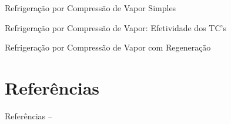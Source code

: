     \begin{frame}{Refrigeração por Compressão de Vapor Simples}\vspace*{-0em}
    \end{frame}

    \begin{frame}{Refrigeração por Compressão de Vapor: Efetividade dos TC's}\vspace*{-0em}
    \end{frame}

    \begin{frame}{Refrigeração por Compressão de Vapor com Regeneração}\vspace*{-0em}
    \end{frame}


\section{Referências}

    \begin{frame}[allowframebreaks]{Referências -- }
        
        
    \end{frame}




